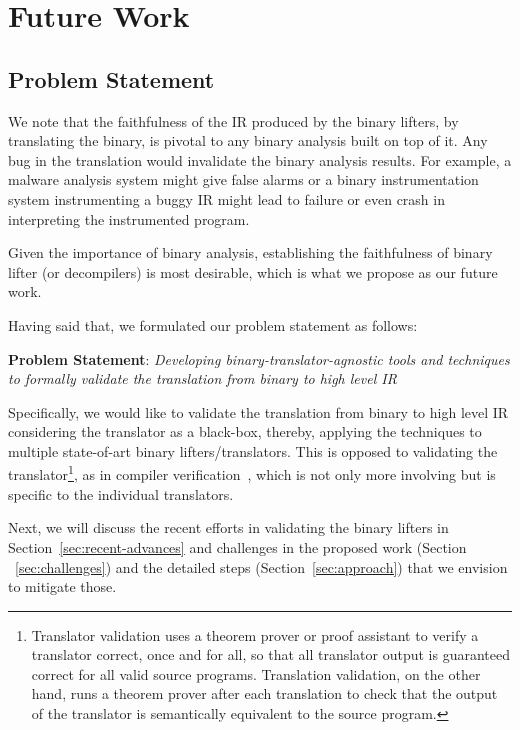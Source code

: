 \chapter{Future Work}\label{sec:problem}
\section{Problem Statement}\label{sec:statement}

We note that the faithfulness of the IR produced by the binary lifters, by
translating the binary, is pivotal to any binary analysis built on top of it.
Any bug in the translation would invalidate the binary analysis results. For
example, a malware analysis system might give false alarms or a binary
instrumentation system instrumenting a buggy IR might lead to failure or even
crash in interpreting the instrumented program. 

Given the importance of binary analysis, establishing the faithfulness of
binary lifter (or decompilers) is most desirable, which is what we propose as
our future work.

Having said that, we formulated our problem statement as follows:

\vspace{10pt}

\noindent\textbf{Problem Statement}: \emph{Developing binary-translator-agnostic tools and techniques to formally  
    validate the translation from binary to high level IR}

Specifically, we would like to validate the translation from binary to high
level IR considering the translator as a black-box, thereby, applying the
techniques to multiple state-of-art binary lifters/translators. This is
opposed to validating the translator\footnote{Translator validation uses a
  theorem prover or proof assistant to verify a translator correct, once and
    for all, so that all translator output is guaranteed correct for all valid
      source programs. Translation validation, on the other hand, runs a
        theorem prover after each translation to check that the output of the
        translator is semantically equivalent to the source program.}, as
         in  compiler verification~\cite{Leroy:2009}, which
        is not only more involving but is specific to the individual
        translators.

Next, we will discuss the recent efforts in validating the binary lifters in
Section~\ref{sec:recent-advances} and challenges in the proposed work (Section
    ~\ref{sec:challenges}) and the detailed steps (Section~\ref{sec:approach}) that we envision to
mitigate those.

